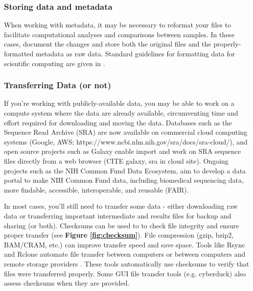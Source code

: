 \documentclass[10pt,letterpaper]{article}
\begin{document}
\subsubsection*{Storing data and metadata} %

When working with metadata, it may be necessary to reformat your files to facilitate computational analyses and comparisons between samples. In these cases, document the changes and store both the original files and the properly-formatted metadata as raw data. Standard guidelines for formatting data for scientific computing are given in \cite{wilson2017good}.


\subsubsection*{Transferring Data (or not)} 

If you're working with publicly-available data, you may be able to work on a compute system where the data are already available, circumventing time and effort required for downloading and moving the data.
Databases such as the Sequence Read Archive (SRA) are now available on commercial cloud computing systems (Google, AWS; https://www.ncbi.nlm.nih.gov/sra/docs/sra-cloud/), and open source projects such as Galaxy enable import and work on SRA sequence files directly from a web browser (CITE galaxy, sra in cloud site). Ongoing projects such as the NIH Common Fund Data Ecosystem, aim to develop a data portal to make NIH Common Fund data, including biomedical sequencing data, more findable,
accessible, interoperable, and reusable (FAIR). 

In most cases, you'll still need to transfer some data - either downloading raw data or transferring important intermediate and results files for backup and sharing (or both). 
Checksums can be used to to check file integrity and ensure proper transfer (see \textbf{Figure \ref{fig:checksum}}).
File compression (gzip, bzip2, BAM/CRAM, etc.) can improve transfer speed and save space.
Tools like Rsync and Rclone automate file transfer between computers or between computers and remote storage providers \cite{bailleul2016rclone}. 
These tools automatically use checksums to verify that files were transferred properly.
Some GUI file transfer tools (e.g. cyberduck) also assess checksums when they are provided.
\end{document}
